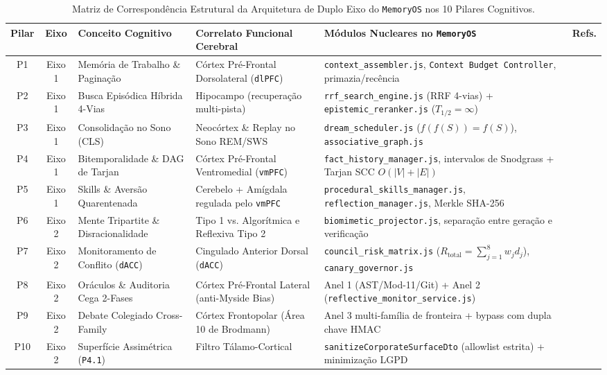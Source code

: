 \documentclass[10pt,twocolumn]{article}
\begin{document}
\begin{table}[t]
\centering
\caption{Matriz de Correspond\^encia Estrutural da Arquitetura de Duplo Eixo do \texttt{MemoryOS} nos 10 Pilares Cognitivos.}
\label{tab:pilares}
\footnotesize
\begin{tabularx}{\textwidth}{@{}c c l l X c@{}}
\toprule
\textbf{Pilar} & \textbf{Eixo} & \textbf{Conceito Cognitivo} & \textbf{Correlato Funcional Cerebral} & \textbf{M\'odulos Nucleares no \texttt{MemoryOS}} & \textbf{Refs.} \\
\midrule
P1 & Eixo 1 & Mem\'oria de Trabalho \& Pagina\c{c}\~ao & C\'ortex Pr\'e-Frontal Dorsolateral (\texttt{dlPFC}) & \texttt{context\_assembler.js}, \texttt{Context Budget Controller}, primazia/rec\^encia & \cite{E01,E02,E03,E04} \\
P2 & Eixo 1 & Busca Epis\'odica H\'ibrida 4-Vias & Hipocampo (recupera\c{c}\~ao multi-pista) & \texttt{rrf\_search\_engine.js} (RRF 4-vias) + \texttt{epistemic\_reranker.js} ($T_{1/2}=\infty$) & \cite{E05,E06,E07,E08} \\
P3 & Eixo 1 & Consolida\c{c}\~ao no Sono (CLS) & Neoc\'ortex \& Replay no Sono REM/SWS & \texttt{dream\_scheduler.js} ($f(f(S))=f(S)$), \texttt{associative\_graph.js} & \cite{E09,E10,E11} \\
P4 & Eixo 1 & Bitemporalidade \& DAG de Tarjan & C\'ortex Pr\'e-Frontal Ventromedial (\texttt{vmPFC}) & \texttt{fact\_history\_manager.js}, intervalos de Snodgrass + Tarjan SCC $O(|V|+|E|)$ & \cite{E12,E13,E14} \\
P5 & Eixo 1 & Skills \& Avers\~ao Quarentenada & Cerebelo + Am\'igdala regulada pelo \texttt{vmPFC} & \texttt{procedural\_skills\_manager.js}, \texttt{reflection\_manager.js}, Merkle SHA-256 & \cite{E15,E16,E17,E18,E19} \\
P6 & Eixo 2 & Mente Tripartite \& Disracionalidade & Tipo 1 vs. Algor\'itmica e Reflexiva Tipo 2 & \texttt{biomimetic\_projector.js}, separa\c{c}\~ao entre gera\c{c}\~ao e verifica\c{c}\~ao & \cite{E20,E21,E22,E23,E24} \\
P7 & Eixo 2 & Monitoramento de Conflito (\texttt{dACC}) & Cingulado Anterior Dorsal (\texttt{dACC}) & \texttt{council\_risk\_matrix.js} ($R_{\mathrm{total}} = \sum_{j=1}^8 w_j d_j$), \texttt{canary\_governor.js} & \cite{E25,E26,E27} \\
P8 & Eixo 2 & Or\'aculos \& Auditoria Cega 2-Fases & C\'ortex Pr\'e-Frontal Lateral (anti-Myside Bias) & Anel 1 (AST/Mod-11/Git) + Anel 2 (\texttt{reflective\_monitor\_service.js}) & \cite{E28,E29,E30} \\
P9 & Eixo 2 & Debate Colegiado Cross-Family & C\'ortex Frontopolar (\'Area 10 de Brodmann) & Anel 3 multi-fam\'ilia de fronteira + bypass com dupla chave HMAC & \cite{E31,E32} \\
P10 & Eixo 2 & Superf\'icie Assim\'etrica (\texttt{P4.1}) & Filtro T\'alamo-Cortical & \texttt{sanitizeCorporateSurfaceDto} (allowlist estrita) + minimiza\c{c}\~ao LGPD & \cite{E21,N01} \\
\bottomrule
\end{tabularx}
\end{table}
\end{document}
